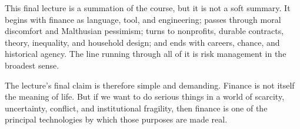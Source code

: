 This final lecture is a summation of the course, but it is not a soft summary. It begins with finance as language, tool, and engineering; passes through moral discomfort and Malthusian pessimism; turns to nonprofits, durable contracts, theory, inequality, and household design; and ends with careers, chance, and historical agency. The line running through all of it is risk management in the broadest sense.

The lecture's final claim is therefore simple and demanding. Finance is not itself the meaning of life. But if we want to do serious things in a world of scarcity, uncertainty, conflict, and institutional fragility, then finance is one of the principal technologies by which those purposes are made real.